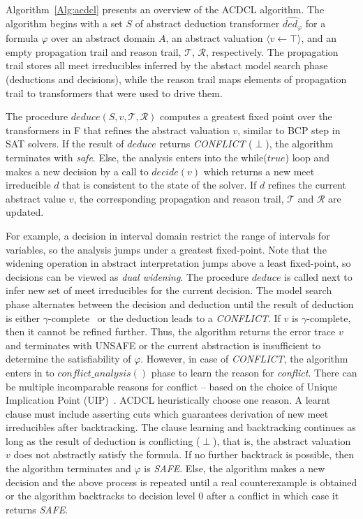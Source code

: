 Algorithm~\ref{Alg:acdcl} presents an overview of the ACDCL algorithm.
The algorithm begins with a set $S$ of abstract deduction transformer 
$\widehat{ded_{\varphi}}$ for a formula $\varphi$ over an abstract 
domain $A$, an abstract valuation $\langle v \leftarrow \top \rangle$, 
and an empty propagation trail and reason trail, $\mathcal{T}$, $\mathcal{R}$, 
respectively.  The propagation trail stores all meet irreducibles inferred 
by the abstact model search phase (deductions and decisions), while the 
reason trail maps elements of propagation trail to transformers that were 
used to drive them.  

The procedure $deduce(S,v,\mathcal{T},\mathcal{R})$ computes a greatest 
fixed point over the transformers in F that refines the abstract valuation 
$v$, similar to BCP step in SAT solvers.  If the result of $deduce$ 
returns {\em CONFLICT} ($\perp$), the algorithm terminates with {\em safe}. 
Else, the analysis enters into the while($true$) loop and makes a new decision 
by a call to $decide(v)$ which returns a new meet irreducible $d$ that is
consistent to the state of the solver.  If $d$ refines the current abstract 
value $v$, the corresponding propagation and reason trail, $\mathcal{T}$ 
and $\mathcal{R}$ are updated. 

For example, a decision in interval domain restrict the range of 
intervals for variables, so the analysis jumps under a 
greatest fixed-point. Note that the widening operation in abstract interpretation 
jumps above a least fixed-point, so decisions can be viewed as 
{\em dual widening}.  The procedure $deduce$ is called next to infer new 
set of meet irreducibles for the current decision.  The model search phase 
alternates between the decision and deduction until the result of deduction 
is either $\gamma$-complete~\cite{gamma} or the deduction leads to a {\em CONFLICT}.  
If $v$ is $\gamma$-complete, then it cannot be refined further.  Thus, the 
algorithm returns the error trace $v$ and terminates with UNSAFE or the 
current abstraction is insufficient to determine the satisfiability of $\varphi$.  
However, in case of {\em CONFLICT}, the algorithm enters in to 
$conflict\_analysis()$ phase to learn the reason for {\em conflict}.  
There can be multiple incomparable reasons for conflict -- based on 
the choice of Unique Implication Point (UIP)~\cite{cdcl}.  ACDCL heuristically 
choose one reason.  A learnt clause must include asserting cuts which 
guarantees derivation of new meet irreducibles after backtracking. The clause 
learning and backtracking continues as long as the result of deduction 
is conflicting ($\perp$), that is, the abstract valuation $v$ does not
abstractly satisfy the formula.  If no further backtrack is possible, 
then the algorithm terminates and $\varphi$ is {\em SAFE}. Else, the 
algorithm makes a new decision and the above process is repeated 
until a real counterexample is obtained or the algorithm backtracks to 
decision level 0 after a conflict in which case it returns {\em SAFE}. 


